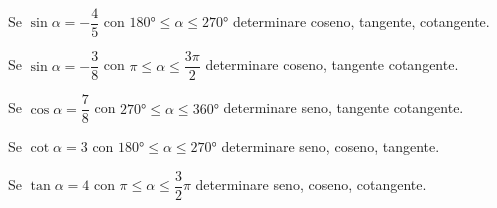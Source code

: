 \begin{exercise}[no solution]
	Se $\sin\alpha=-\dfrac{4}{5}$ con $\ang{180}\leq\alpha\leq\ang{270}$ determinare  coseno, tangente, cotangente.
\end{exercise}
\begin{exercise}[no solution]
	Se $\sin\alpha=-\dfrac{3}{8}$  con $\pi\leq\alpha\leq\dfrac{3\pi}{2}$ determinare coseno, tangente cotangente.
\end{exercise}
\begin{exercise}[no solution]
	Se $\cos\alpha=\dfrac{7}{8}$  con $\ang{270}\leq\alpha\leq\ang{360}$ determinare seno, tangente cotangente.
\end{exercise}
\begin{exercise}[no solution]
	Se $\cot\alpha=3$ con $\ang{180}\leq\alpha\leq\ang{270}$ determinare seno, coseno, tangente.
\end{exercise}
\begin{exercise}[no solution]
	Se $\tan\alpha=4$ con $\pi\leq\alpha\leq\dfrac{3}{2}\pi$ determinare seno, coseno, cotangente.
\end{exercise}
